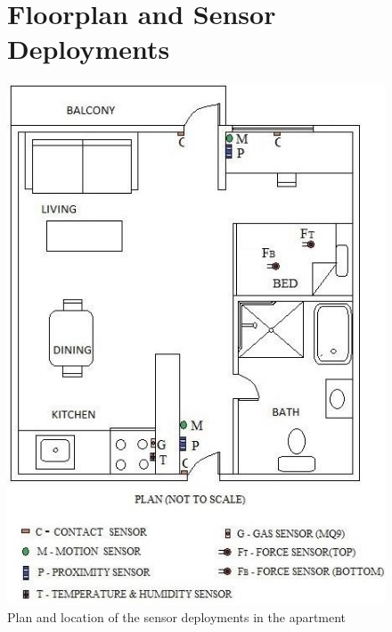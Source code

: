 \begin{appendices}
    \begin{figure}[ht!]
        \section{Floorplan and Sensor Deployments \cite{joseMalekian2017}}
        \label{sec:floorplan-and-sensor-deployments}
        \includegraphics[width=0.7\linewidth]{datasets/images/A3}
        \caption{Plan and location of the sensor deployments in the apartment}\label{fig:figure6}
        \cleardoublepage
    \end{figure}

    \begin{figure}[ht!]

\end{figure}
\end{appendices}
